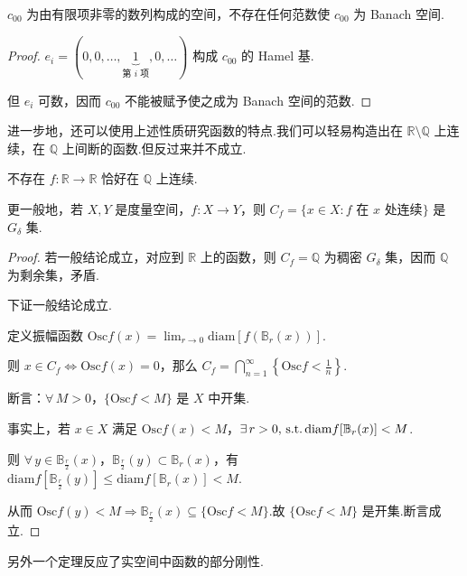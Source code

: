 \begin{corollary}
    $c_{00}$ 为由有限项非零的数列构成的空间，不存在任何范数使 $c_{00}$ 为 Banach 空间.
\end{corollary}
\begin{proof}
    $e_i = (0, 0, \dots, \underbrace{1}_{\text{第 } i \text{ 项}}, 0, \dots)$ 构成 $c_{00}$ 的 Hamel 基.\par
    但 $e_i$ 可数，因而 $c_{00}$ 不能被赋予使之成为 Banach 空间的范数.
\end{proof}

进一步地，还可以使用上述性质研究函数的特点.我们可以轻易构造出在 $\mathbb{R} \setminus \mathbb{Q}$ 上连续，在 $\mathbb{Q}$ 上间断的函数.但反过来并不成立.

\begin{theorem}
    不存在 $f \colon \mathbb{R} \to \mathbb{R}$ 恰好在 $\mathbb{Q}$ 上连续.\par
    更一般地，若 $X, Y$ 是度量空间，$f \colon X \to Y$，则 $C_f = \{x \in X : f \text{ 在 } x \text{ 处连续}\}$ 是 $G_\delta$ 集.
\end{theorem}
\begin{proof}
    若一般结论成立，对应到 $\mathbb{R}$ 上的函数，则 $C_f = \mathbb{Q}$ 为稠密 $G_\delta$ 集，因而 $\mathbb{Q}$ 为剩余集，矛盾.\par
    下证一般结论成立.\par
    定义振幅函数 $\mathrm{Osc} f(x) = \lim_{r \to 0} \mathrm{diam}[f(\mathbb{B}_r(x))]$.\par
    则 $x \in C_f \iff \mathrm{Osc} f(x) = 0$，那么 $C_f = \bigcap_{n=1}^\infty \left\{\mathrm{Osc} f < \frac{1}{n}\right\}$.\par
    断言：$\forall\, M > 0$，$\{\mathrm{Osc} f < M\}$ 是 $X$ 中开集.\par
    事实上，若 $x \in X$ 满足 $\mathrm{Osc} f(x) < M$，$\exists\, r > 0,\operatorname{\,\text{s.t.}} \mathrm{diam} f[\mathbb{B}_{r}(x)] < M$.\par
    则 $\forall\, y \in \mathbb{B}_{\frac{r}{2}}(x)$，$\mathbb{B}_{\frac{r}{2}}(y) \subset \mathbb{B}_{r}(x)$，有 $\mathrm{diam} f[\mathbb{B}_{\frac{r}{2}}(y)] \leq \mathrm{diam} f[\mathbb{B}_{r}(x)] < M$.\par
    从而 $\mathrm{Osc} f(y) < M \Rightarrow \mathbb{B}_{\frac{r}{2}}(x) \subseteq \{\mathrm{Osc} f < M\}$.故 $\{\mathrm{Osc} f < M\}$ 是开集.断言成立.
\end{proof}

另外一个定理反应了实空间中函数的部分刚性.

